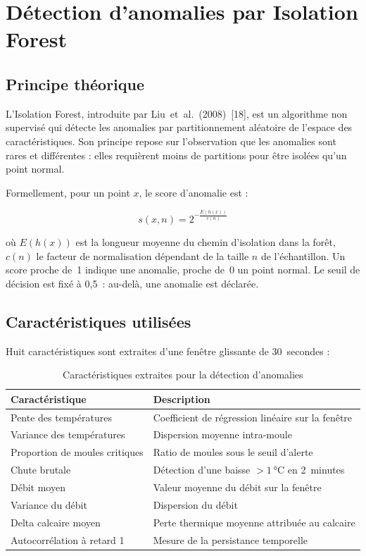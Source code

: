 \section{Détection d'anomalies par Isolation Forest}

\subsection{Principe théorique}

L'Isolation Forest, introduite par Liu~et~al.~(2008)~[18], est un algorithme non supervisé qui détecte les anomalies par partitionnement aléatoire de l'espace des caractéristiques. Son principe repose sur l'observation que les anomalies sont rares et différentes : elles requièrent moins de partitions pour être isolées qu'un point normal.

Formellement, pour un point \(x\), le score d'anomalie est :

\begin{equation}
s(x, n) = 2^{-\frac{E(h(x))}{c(n)}}
\label{eq:if_score}
\end{equation}

où \(E(h(x))\) est la longueur moyenne du chemin d'isolation dans la forêt, \(c(n)\) le facteur de normalisation dépendant de la taille \(n\) de l'échantillon. Un score proche de~1 indique une anomalie, proche de~0 un point normal. Le seuil de décision est fixé à 0,5~: au-delà, une anomalie est déclarée.

\subsection{Caractéristiques utilisées}

Huit caractéristiques sont extraites d'une fenêtre glissante de 30~secondes :

\begin{table}[htbp]
\centering
\caption{Caractéristiques extraites pour la détection d'anomalies}
\label{tab:features_if}
\begin{tabular}{p{}p{}}
\toprule
\textbf{Caractéristique} & \textbf{Description} \\
\midrule
Pente des températures & Coefficient de régression linéaire sur la fenêtre \\
Variance des températures & Dispersion moyenne intra-moule \\
Proportion de moules critiques & Ratio de moules sous le seuil d'alerte \\
Chute brutale & Détection d'une baisse \(>1~\si{\celsius}\) en 2~minutes \\
Débit moyen & Valeur moyenne du débit sur la fenêtre \\
Variance du débit & Dispersion du débit \\
Delta calcaire moyen & Perte thermique moyenne attribuée au calcaire \\
Autocorrélation à retard 1 & Mesure de la persistance temporelle \\
\bottomrule
\end{tabular}
\end{table}

